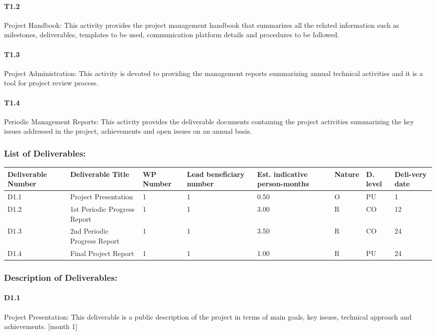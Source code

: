 \documentclass{article}
\begin{document}
 \paragraph{T1.2} Project Handbook: This activity provides the project management handbook that summarizes all the related information such as
 milestones, deliverables, templates to be used, communication platform details and procedures to be followed.
 \paragraph{T1.3} Project Administration: This activity is devoted to providing the management reports summarizing annual technical activities and
 it is a tool for project review process.
 \paragraph{T1.4} Periodic Management Reports: This activity provides the deliverable documents containing the project activities summarizing the key issues
 addressed in the project, achievements and open issues on an annual basis.
 
\subsubsection{List of Deliverables:}
\begin{center}
	\begin{tabular}{ |p{1.6cm}|p{2cm}|p{0.8cm}|p{0.8cm}|p{0.9cm}|p{1cm}|p{0.5cm}|p{0.8cm}| }
		\hline
		Deliverable Number & Deliverable Title & WP Number & Lead beneficiary number & Est. indicative person-months & Nature & D. level & Deli-very date \\ \hline
		D1.1 & Project Presentation & 1 & 1 & 0.50 & O & PU & 1 \\ \hline
		D1.2 & 1st Periodic Progress Report & 1 & 1 & 3.00 & R & CO & 12 \\ \hline
		D1.3 & 2nd Periodic Progress Report & 1 & 1 & 3.50 & R & CO & 24 \\ \hline
		D1.4 & Final Project Report & 1 & 1 & 1.00 & R & PU & 24 \\ \hline
	\end{tabular}
\end{center}
 
\subsubsection{Description of Deliverables:}
\paragraph{D1.1} Project Presentation: This deliverable is a public description of the project in terms of main goals, key issues, technical approach and achievements. [month 1]
\end{document}
